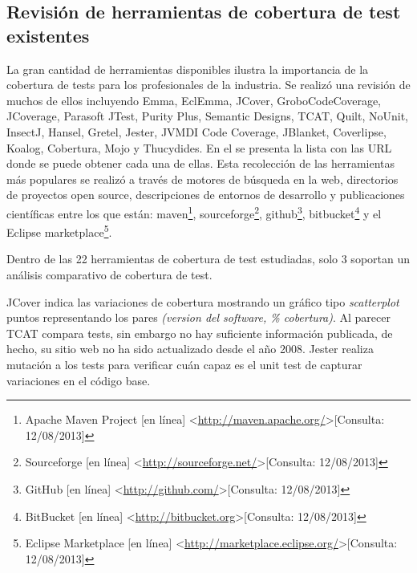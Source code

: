 \subsection{Revisión de herramientas de cobertura de test existentes}

\par La gran cantidad de herramientas disponibles ilustra la importancia de la cobertura de tests para los profesionales de la industria. Se realizó una revisión de muchos de ellos incluyendo Emma, EclEmma, JCover, GroboCodeCoverage, JCoverage, Parasoft JTest, Purity Plus, Semantic Designs, TCAT, Quilt, NoUnit, InsectJ, Hansel, Gretel, Jester, JVMDI Code Coverage, JBlanket, Coverlipse, Koalog, Cobertura, Mojo y Thucydides. En el  se presenta la lista con las URL donde se puede obtener cada una de ellas. Esta recolección de las herramientas más populares se realizó a través de motores de búsqueda en la web, directorios de proyectos open source, descripciones de entornos de desarrollo y publicaciones científicas entre los que están: maven\footnote{Apache Maven Project [en línea] \textless\url{http://maven.apache.org/}\textgreater [Consulta: 12/08/2013]}, sourceforge\footnote{Sourceforge [en línea] \textless\url{http://sourceforge.net/}\textgreater [Consulta: 12/08/2013]}, github\footnote{GitHub [en línea] \textless\url{http://github.com/}\textgreater [Consulta: 12/08/2013]}, bitbucket\footnote{BitBucket [en línea] \textless\url{http://bitbucket.org}\textgreater [Consulta: 12/08/2013]} y el Eclipse marketplace\footnote{Eclipse Marketplace [en línea] \textless\url{http://marketplace.eclipse.org/}\textgreater [Consulta: 12/08/2013]}. 

\par Dentro de las 22 herramientas de cobertura de test estudiadas, solo 3 soportan un análisis comparativo de cobertura de test. 
\par JCover indica las variaciones de cobertura mostrando un gráfico tipo \emph{scatterplot} puntos representando los pares \emph{(version del software, \% cobertura)}. Al parecer TCAT compara tests, sin embargo no hay suficiente información publicada, de hecho, su sitio web no ha sido actualizado desde el año 2008. Jester realiza mutación a los tests para verificar cuán capaz es el unit test de capturar variaciones en el código base.
